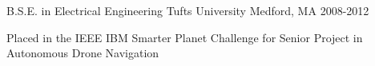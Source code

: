 

\begin{cventries}

  \cventry
    {B.S.E. in Electrical Engineering} %
    {Tufts University} %
    {Medford, MA} %
    {2008-2012} %
    {
      \begin{cvitems} %
        \item {Placed in the IEEE IBM Smarter Planet Challenge for Senior Project in Autonomous Drone Navigation}
      \end{cvitems}
    }

\end{cventries}
